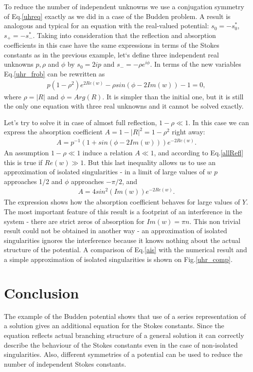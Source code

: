 \documentclass[aps,prl,preprint,superscriptaddress]{revtex4}
\begin{document}
To reduce the number of independent unknowns we use a conjugation symmetry of Eq.\ref{uhreq} exactly as we did in a case of the Budden problem. A result is analogous and typical for an equation with the real-valued potential: $s_0=-s_0^*$, $s_+=-s_-^*$. Taking into consideration that the reflection and absorption coefficients in this case have the same expressions in terms of the Stokes constants as in the previous example, let`s define three independent real unknowns $p, \rho$ and $\phi$ by $s_0=2ip$ and $s_-=-\rho e^{i\phi}$. In terms of the new variables Eq.\ref{uhr_frob} can be rewritten as
\begin{eqnarray}
p (1-\rho^2) e^{2Re(w)} - \rho sin(\phi-2Im(w)) - 1 = 0,   \label{realFrobEq}
\end{eqnarray}
where $\rho=|R|$ and $\phi=Arg(R)$. It is simpler than the initial one, but it is still the only one equation with three real unknowns and it cannot be solved exactly.

Let's try to solve it in case of almost full reflection, $1-\rho \ll 1$. In this case we can express the absorption coefficient $A=1-|R|^2=1-\rho^2$ right away:
\begin{eqnarray}
A=p^{-1}(1 + sin(\phi-2Im(w)))e^{-2Re(w)}. \label{allRefl}
\end{eqnarray}
An assumption $1-\rho \ll 1$ induce a relation $A \ll 1$, and according to Eq.\ref{allRefl} this is true if $Re(w) \gg 1$. But this last inequality allows us to use an approximation of isolated singularities - in a limit of large values of $w$ $p$ approaches 1/2 and $\phi$ approaches $-\pi/2$, and
\begin{eqnarray}
A=4sin^2(Im(w))e^{-2Re(w)}.   \label{ais}
\end{eqnarray}
The expression shows how the absorption coefficient behaves for large values of $Y$. The most important feature of this result is a footprint of an interference in the system - there are strict zeros of absorption for $Im(w)=\pi n$. This non trivial result could not be obtained in another way - an approximation of isolated singularities ignores the interference because it knows nothing about the actual structure of the potential. A comparison of Eq.\ref{ais} with the numerical result and a simple approximation of isolated singularities is shown on Fig.\ref{uhr_comp}.





\section{Conclusion \label{con}}
The example of the Budden potential shows that use of a series representation of a solution gives an additional equation for the Stokes constants. Since the equation reflects actual branching structure of a general solution it can correctly describe the behaviour of the Stokes constants even in the case of non-isolated singularities. Also, different symmetries of a potential can be used to reduce the number of independent Stokes constants.
\end{document}
